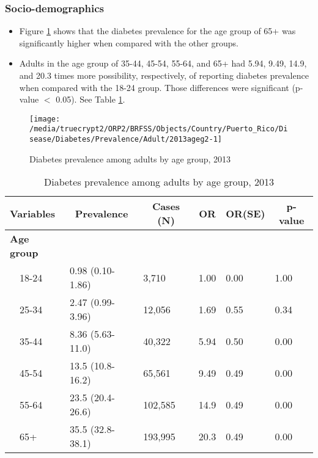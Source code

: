 \newpage
\subsubsection{Socio-demographics}

\begin{itemize}

\item Figure \ref{fig:age.Diabetes.2013} shows that the diabetes prevalence for the age group of 65+ was significantly higher when compared with the other groups.

\item Adults in the age group of 35-44, 45-54, 55-64, and 65+ had 5.94, 9.49, 14.9, and 20.3 times more possibility, respectively, of reporting diabetes prevalence when compared with the 18-24 group. Those differences were significant (p-value $<$ 0.05). See Table \ref{tab:age.Diabetes.2013}.


\end{itemize}


\begin{figure}[H]
\caption{Diabetes prevalence among adults by age group, 
2013}
\begin{knitrout}
\color{fgcolor}

{\centering \texttt{[image: /media/truecrypt2/ORP2/BRFSS/Objects/Country/Puerto\_Rico/Disease/Diabetes/Prevalence/Adult/2013ageg2-1]} 

}



\end{knitrout}
\label{fig:age.Diabetes.2013}
\end{figure}

\begin{table}[H]
\caption{Diabetes prevalence  among adults by age group, 2013\label{tab:age.Diabetes.2013}} 
\begin{center}
\begin{tabular}{llllll}
\hline\hline
\multicolumn{1}{l}{Variables}&\multicolumn{1}{c}{Prevalence}&\multicolumn{1}{c}{Cases (N)}&\multicolumn{1}{c}{OR}&\multicolumn{1}{c}{OR(SE)}&\multicolumn{1}{c}{p-value}\tabularnewline
\hline
{\bfseries Age group}&&&&&\tabularnewline
~~18-24&0.98 (0.10-1.86)&  3,710&1.00&0.00&1.00\tabularnewline
~~25-34&2.47 (0.99-3.96)& 12,056&1.69&0.55&0.34\tabularnewline
~~35-44&8.36 (5.63-11.0)& 40,322&5.94&0.50&0.00\tabularnewline
~~45-54&13.5 (10.8-16.2)& 65,561&9.49&0.49&0.00\tabularnewline
~~55-64&23.5 (20.4-26.6)&102,585&14.9&0.49&0.00\tabularnewline
~~65+&35.5 (32.8-38.1)&193,995&20.3&0.49&0.00\tabularnewline
\hline
\end{tabular}\end{center}

\end{table}


